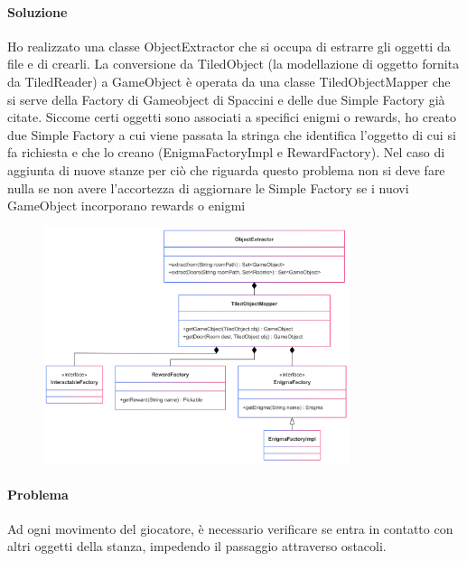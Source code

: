 \documentclass[a4paper,12pt]{report}
\begin{document}
\paragraph{Soluzione} %
Ho realizzato una classe ObjectExtractor che si occupa di estrarre gli oggetti da file e di crearli.
La conversione da TiledObject (la modellazione di oggetto fornita da TiledReader) a GameObject è operata da una classe TiledObjectMapper che si serve della Factory di Gameobject di Spaccini e delle due Simple Factory già citate.
Siccome certi oggetti sono associati a specifici enigmi o rewards, ho creato due Simple Factory a cui viene passata la stringa che identifica l'oggetto di cui si fa richiesta e che lo creano (EnigmaFactoryImpl e RewardFactory).
Nel caso di aggiunta di nuove stanze per ciò che riguarda questo problema non si deve fare nulla se non avere l'accortezza di aggiornare le Simple Factory se i nuovi GameObject incorporano rewards o enigmi

\begin{figure} 
    \centering
    \includegraphics[width=0.8\textwidth]{img/ObjExtr.png}
    \label{img:ObjExtr}
\end{figure}


\paragraph{Problema} %
Ad ogni movimento del giocatore, è necessario verificare se entra in contatto con altri oggetti della stanza, impedendo il passaggio attraverso ostacoli.
\end{document}
